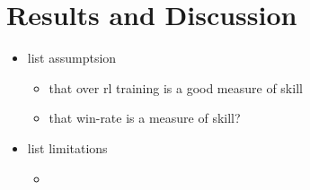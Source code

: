 \documentclass[../main.tex]{subfiles}
\begin{document}
\chapter{Results and Discussion}
\label{cha:Results}

\begin{itemize}
    \item list assumptsion
    \begin{itemize}
        \item that over rl training is a good measure of skill
        \item that win-rate is a measure of skill?
    \end{itemize}
    \item list limitations
    \begin{itemize}
        \item 
    \end{itemize}
\end{itemize}
\end{document}
